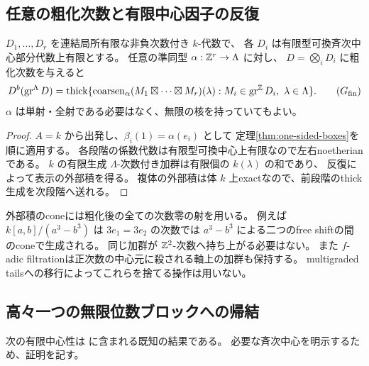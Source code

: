 \subsection{任意の粗化次数と有限中心因子の反復}

\begin{theorem}[有限中心代数の外部積生成]\label{thm:finite-center-boxes}
 \(D_1,\ldots,D_r\) を連結局所有限な非負次数付き \(k\)-代数で、
 各 \(D_i\) は有限型可換斉次中心部分代数上有限とする。
 任意の準同型 \(\alpha:\mathbb Z^r\to\Lambda\) に対し、
 \(D=\bigotimes_iD_i\) に粗化次数を与えると
 \[
 D^b(\operatorname{gr}^{\Lambda}D)
 =\thick\{\operatorname{coarsen}_{\alpha}
 (M_1\boxtimes\cdots\boxtimes M_r)(\lambda):
 M_i\in\operatorname{gr}^{\ZZ}D_i,\ \lambda\in\Lambda\}.
 \tag{\(G_{\mathrm{fin}}\)}\label{eq:finite-center-generation}
 \]
 \(\alpha\) は単射・全射である必要はなく、無限の核を持っていてもよい。
\end{theorem}
\begin{proof}
 \(A=k\) から出発し、\(\beta_i(1)=\alpha(e_i)\) として
 定理\ref{thm:one-sided-boxes}を順に適用する。
 各段階の係数代数は有限型可換中心上有限なので左右noetherianである。
 \(k\) の有限生成 \(\Lambda\)-次数付き加群は有限個の \(k(\lambda)\) の和であり、
 反復によって表示の外部積を得る。
 複体の外部積は体 \(k\) 上exactなので、前段階のthick生成を次段階へ送れる。
\end{proof}

\begin{remark}[nonliftable対象と軸torsion]
 外部積のconeには粗化後の全ての次数零の射を用いる。
 例えば \(k[a,b]/(a^3-b^3)\) は \(3e_1=3e_2\) の次数では
 \(a^3-b^3\) による二つのfree shiftの間のconeで生成される。
 同じ加群が \(\mathbb Z^2\)-次数へ持ち上がる必要はない。
 また \(f\)-adic filtrationは正次数の中心元に殺される軸上の加群も保持する。
 multigraded tailsへの移行によってこれらを捨てる操作は用いない。
\end{remark}

\subsection{高々一つの無限位数ブロックへの帰結}

次の有限中心性は \cite[Corollary 2.3]{SmithTate} に含まれる既知の結果である。
必要な斉次中心を明示するため、証明を記す。

